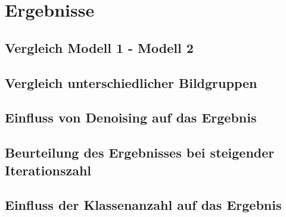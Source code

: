 	\section{Ergebnisse}
	\label{sec:results}
	
		\subsection{Vergleich Modell 1 - Modell 2}
		\label{sub:comp-m1-m2}
		
		\subsection{Vergleich unterschiedlicher Bildgruppen}
		\label{sub:comp-diff-images}
		
		\subsection{Einfluss von Denoising auf das Ergebnis}
		\label{sub:influence-of-denoising}
		
		\subsection{Beurteilung des Ergebnisses bei steigender Iterationszahl}
		\label{sub:judging-higher-iteration}
		
		\subsection{Einfluss der Klassenanzahl auf das Ergebnis}
		\label{sub:influence-of-classes}